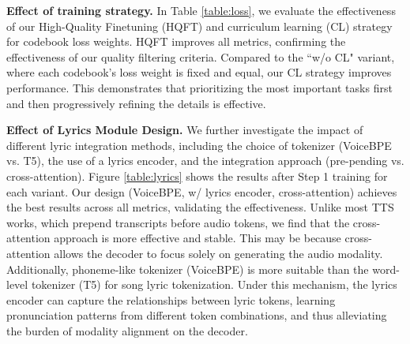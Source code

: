 \noindent\textbf{Effect of training strategy.}
In Table \ref{table:loss}, we evaluate the effectiveness of our High-Quality Finetuning (HQFT) and curriculum learning (CL) strategy for codebook loss weights. HQFT improves all metrics, confirming the effectiveness of our quality filtering criteria. 
Compared to the ``w/o CL" variant, where each codebook's loss weight is fixed and equal, our CL strategy improves performance. This demonstrates that prioritizing the most important tasks first and then progressively refining the details is effective.






\noindent\textbf{Effect of Lyrics Module Design.}
We further investigate the impact of different lyric integration methods, including the choice of tokenizer (VoiceBPE vs. T5), the use of a lyrics encoder, and the integration approach (pre-pending vs. cross-attention). Figure \ref{table:lyrics} shows the results after Step 1 training for each variant. Our design (VoiceBPE, w/ lyrics encoder, cross-attention) achieves the best results across all metrics, validating the effectiveness. Unlike most TTS works, which prepend transcripts before audio tokens, we find that the cross-attention approach is more effective and stable. This may be because cross-attention allows the decoder to focus solely on generating the audio modality. Additionally, phoneme-like tokenizer (VoiceBPE) is more suitable than the word-level tokenizer (T5) for song lyric tokenization. Under this mechanism, the lyrics encoder can capture the relationships between lyric tokens, learning pronunciation patterns from different token combinations, and thus alleviating the burden of modality alignment on the decoder. 













